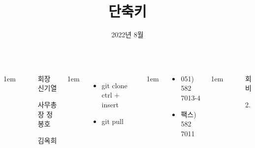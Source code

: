 \documentclass[	20pt, 
							a1paper, 
							portrait, %
							margin=0mm, %
							innermargin=10mm,  		%
							colspace=5mm, 
							subcolspace=0mm
							]{tikzposter}
\title{단축키}
\author{ 2022년 8월 }
\begin{document}
	\maketitle

	\begin{columns}


			{
					\setlength{\leftmargini}{7em}
					\setlength{\labelsep} {1em}
				\begin{LARGE}
					\begin{itemize}
					\item [회장] 신기열
					\item [사무총장]정봉호
					\item [] 김옥희
					\end{itemize}
				\end{LARGE}
			}

			{
					\setlength{\leftmargini}{7em}
					\setlength{\labelsep} {1em}
					\begin{itemize}
					\item git clone ctrl + insert
					\item git pull
					\end{itemize}
			}

			{
					\setlength{\leftmargini}{7em}
					\setlength{\labelsep} {1em}
				\begin{LARGE}
					\begin{itemize}
					\item 051) 582 7013-4
					\item 팩스) 582 7011
					\end{itemize}
				\end{LARGE}
			}


			{
					\setlength{\leftmargini}{4em}
					\setlength{\labelsep} {1em}
				\begin{LARGE}
					\begin{itemize}
					\item [회비]
					\item [2.] 
					\end{itemize}
				\end{LARGE}
			}




\end{columns}
\end{document}
